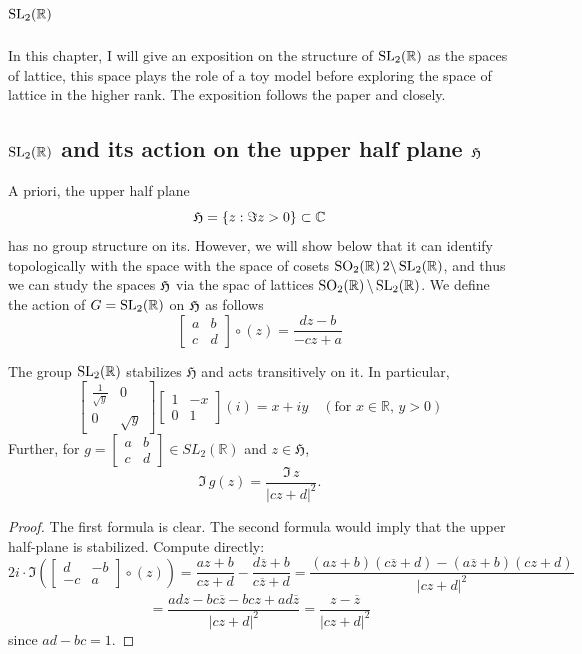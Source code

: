 \chapter{$\operatorname{SL_2(\mathbb{R})}$} %

In this chapter, I will give an exposition on the structure of $\operatorname{SL_2(\mathbb{R})}$ as the spaces of lattice, this space
plays the role of a toy model before exploring the space of lattice in the higher rank. The exposition follows
the paper \cite{} and  \cite{} closely.
\section{$\operatorname{SL_2(\mathbb{R})}$ and its action on the upper half plane $\operatorname{\mathfrak{H}}$}
A priori, the upper half plane
\[\operatorname{\mathfrak{H}} = \left\lbrace z: \Im z >0 \right\rbrace \subset \mathbb{C}\]
has no group structure on its. However, we will show below that it can identify topologically with the space
with the space of cosets $\SO22\backslash\SLR$, and thus we can study the spaces $\operatorname{\mathfrak{H}}$ via the spac of lattices $\SO2\backslash\SLR$.
We define the action of $G= \operatorname{SL_2(\mathbb{R})}$ on $\operatorname{\mathfrak{H}}$ as follows
\[
  \begin{bmatrix}a & b \\ c & d\end{bmatrix} \circ (z) = \frac{dz -b}{-cz + a}
\]
\begin{prop}\label{h-as-matrices}
  The group $\operatorname{SL_2(\mathbb{R})}$ stabilizes \(\mathfrak{H}\) and acts transitively on it. In particular,
  \[
    \begin{bmatrix}\frac{1}{\sqrt{y}} & 0 \\ 0 & \sqrt{y}\end{bmatrix}\begin{bmatrix}1 & -x \\ 0 & 1\end{bmatrix}(i) = x + iy \quad (\text{for } x \in \mathbb{R}, \, y > 0)
  \]
  Further, for \(g = \begin{bmatrix}a & b \\ c & d\end{bmatrix} \in SL_{2}(\mathbb{R})\) and \(z \in \mathfrak{H}\),
  \[
    \text{$\Im$}\,g(z) = \frac{\text{$\Im$}\,z}{|cz + d|^2}.
  \]
\end{prop}
\begin{proof}
  The first formula is clear. The second formula would imply that the upper half-plane is stabilized. Compute directly:
  \[
    2i \cdot \text{$\Im$} \left( \begin{bmatrix} d & -b \\ -c & a \end{bmatrix} \circ(z) \right) = \frac{az + b}{cz + d} - \frac{d\overline{z} + b}{c\overline{z} + d} = \frac{(az + b)(c\overline{z} + d) - (a\overline{z} + b)(cz + d)}{|cz + d|^2}
  \]
  \[
    = \frac{adz - bc\overline{z} - bcz + ad\overline{z}}{|cz + d|^2} = \frac{z - \overline{z}}{|cz + d|^2}
  \]
  since \( ad - bc = 1 \).
\end{proof}
